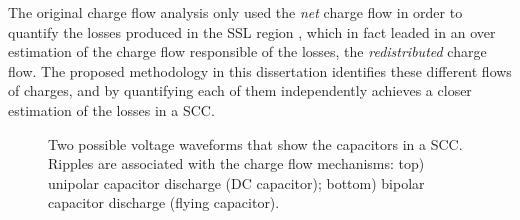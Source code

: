 The original charge flow analysis only used the \emph{net} charge flow in order to quantify the losses produced in the SSL region , which in fact leaded in an over estimation of the charge flow responsible of the losses, the \emph{redistributed} charge flow. The proposed methodology in this dissertation identifies these different flows of charges, and by quantifying each of them independently achieves a closer estimation of the losses in a SCC.

\begin{figure}[!h]
\centering

\caption[Voltage ripple in the SCC's capacitors]{Two possible voltage waveforms that show the capacitors in a SCC. Ripples are associated with the charge flow mechanisms: top) unipolar capacitor discharge (DC capacitor); bottom) bipolar capacitor discharge (flying capacitor).}
\label{fig:cap_riples}
\end{figure}

